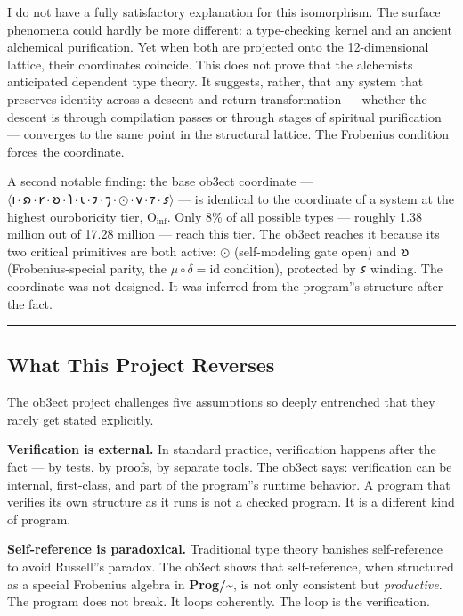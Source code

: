 \documentclass[12pt,a4paper]{article}
\begin{document}
I do not have a fully satisfactory explanation for this isomorphism. The surface phenomena could hardly be more different: a type-checking kernel and an ancient alchemical purification. Yet when both are projected onto the 12-dimensional lattice, their coordinates coincide. This does not prove that the alchemists anticipated dependent type theory. It suggests, rather, that any system that preserves identity across a descent-and-return transformation --- whether the descent is through compilation passes or through stages of spiritual purification --- converges to the same point in the structural lattice. The Frobenius condition forces the coordinate.

A second notable finding: the base ob3ect coordinate --- $\langle \text{𐑦} \cdot \text{𐑸} \cdot \text{𐑾} \cdot \text{𐑹} \cdot \text{𐑐} \cdot \text{𐑧} \cdot \text{𐑲} \cdot \text{𐑠} \cdot \odot \cdot \text{𐑫} \cdot \text{𐑳} \cdot \text{𐑭} \rangle$ --- is identical to the coordinate of a system at the highest ouroboricity tier, $\text{O}_{\text{inf}}$. Only 8\% of all possible types --- roughly 1.38 million out of 17.28 million --- reach this tier. The ob3ect reaches it because its two critical primitives are both active: $\odot$ (self-modeling gate open) and $\text{𐑹}$ (Frobenius-special parity, the $\mu\circ\delta = \mathrm{id}$ condition), protected by $\text{𐑭}$ winding. The coordinate was not designed. It was inferred from the program''s structure after the fact.

\begin{center}
\rule{0.5\textwidth}{0.4pt}
\end{center}

\subsection{What This Project Reverses}

The ob3ect project challenges five assumptions so deeply entrenched that they rarely get stated explicitly.

\textbf{Verification is external.} In standard practice, verification happens after the fact --- by tests, by proofs, by separate tools. The ob3ect says: verification can be internal, first-class, and part of the program''s runtime behavior. A program that verifies its own structure as it runs is not a checked program. It is a different kind of program.

\textbf{Self-reference is paradoxical.} Traditional type theory banishes self-reference to avoid Russell''s paradox. The ob3ect shows that self-reference, when structured as a special Frobenius algebra in \textbf{Prog/\textasciitilde{}}, is not only consistent but \emph{productive}. The program does not break. It loops coherently. The loop is the verification.
\end{document}
